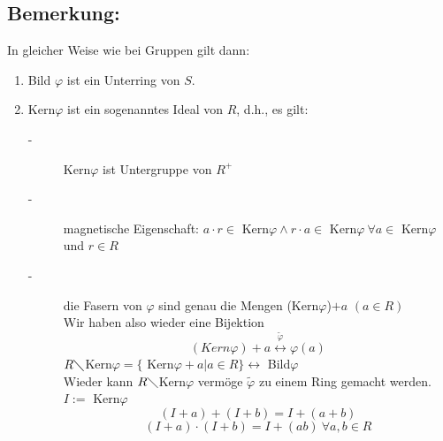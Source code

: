 \subsection{Bemerkung:}
In gleicher Weise wie bei Gruppen gilt dann:
\begin{enumerate}[label={(\alph*)}]
	\item Bild $\varphi$ ist ein Unterring von $S$.
	\item Kern$\varphi$ ist ein sogenanntes Ideal von $R$, d.h., es gilt:
	\begin{description}
		\item[-] Kern$\varphi$ ist Untergruppe von $R^{+}$
		\item[-] magnetische Eigenschaft: $a \cdot r \in$ Kern$\varphi \wedge r \cdot a \in$ Kern$\varphi \ \forall a \in$ 
			Kern$\varphi$ und $r \in R$
		\item[-] die Fasern von $\varphi$ sind genau die Mengen (Kern$\varphi$)$+a$ $(a \in R)$\\
				Wir haben also wieder eine Bijektion
		\begin{equation*}
			(Kern\varphi) + a \mathop{\longleftrightarrow}\limits^{\tilde{\varphi}} \varphi(a)
		\end{equation*}
		$R\diagdown$Kern$\varphi = \{$ Kern$\varphi +a| a \in R\} \longleftrightarrow$ Bild$\varphi$\\
		Wieder kann $R\diagdown$Kern$\varphi$ vermöge $\tilde{\varphi}$ zu einem Ring gemacht werden.\\
		$I :=$ Kern$\varphi$
		\begin{equation*}
			(I+a)+(I+b)=I+(a+b)
		\end{equation*}
		\begin{equation*}
			(I+a)\cdot(I+b)=I+(ab) \ \forall a,b \in R
		\end{equation*}
	\end{description}
\end{enumerate}
